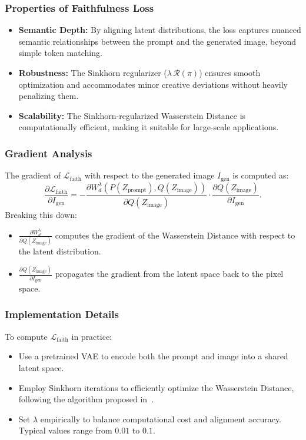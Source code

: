 \subsubsection{Properties of Faithfulness Loss}
\begin{itemize}
    \item \textbf{Semantic Depth:} By aligning latent distributions, the loss captures nuanced semantic relationships between the prompt and the generated image, beyond simple token matching.
    \item \textbf{Robustness:} The Sinkhorn regularizer (\(\lambda \, \mathcal{R}(\pi)\)) ensures smooth optimization and accommodates minor creative deviations without heavily penalizing them.
    \item \textbf{Scalability:} The Sinkhorn-regularized Wasserstein Distance is computationally efficient, making it suitable for large-scale applications.
\end{itemize}

\subsubsection{Gradient Analysis}
The gradient of \(\mathcal{L}_{\text{faith}}\) with respect to the generated image \(I_{\text{gen}}\) is computed as:
\[
\frac{\partial \mathcal{L}_{\text{faith}}}{\partial I_{\text{gen}}} = - \frac{\partial W_d^\lambda(P(Z_{\text{prompt}}), Q(Z_{\text{image}}))}{\partial Q(Z_{\text{image}})} \cdot \frac{\partial Q(Z_{\text{image}})}{\partial I_{\text{gen}}}.
\]
Breaking this down:
\begin{itemize}
    \item \(\frac{\partial W_d^\lambda}{\partial Q(Z_{\text{image}})}\) computes the gradient of the Wasserstein Distance with respect to the latent distribution.
    \item \(\frac{\partial Q(Z_{\text{image}})}{\partial I_{\text{gen}}}\) propagates the gradient from the latent space back to the pixel space.
\end{itemize}

\subsubsection{Implementation Details}
To compute \(\mathcal{L}_{\text{faith}}\) in practice:
\begin{itemize}
    \item Use a pretrained VAE to encode both the prompt and image into a shared latent space.
    \item Employ Sinkhorn iterations to efficiently optimize the Wasserstein Distance, following the algorithm proposed in~\cite{cuturi2013sinkhorn}.
    \item Set \(\lambda\) empirically to balance computational cost and alignment accuracy. Typical values range from \(0.01\) to \(0.1\).
\end{itemize}

